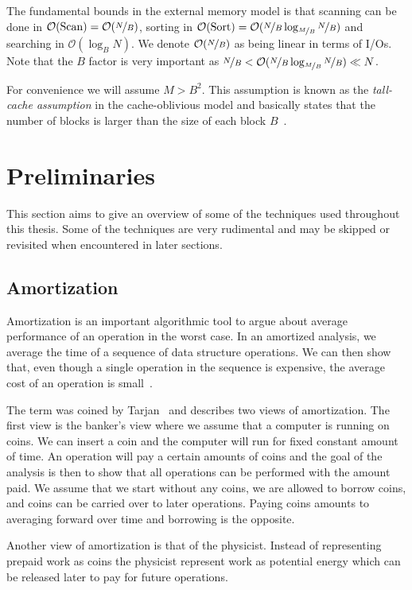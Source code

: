 \documentclass[twoside,11pt,openright]{report}
\begin{document}
The fundamental bounds in the external memory model is that scanning can be done in $\mathcal{O}(\text{Scan}) = \mathcal{O}(\nicefrac{N}{B})$, sorting in $\mathcal{O}(\text{Sort}) = \mathcal{O}(\nicefrac{N}{B} \log_{\nicefrac{M}{B}}\nicefrac{N}{B})$ and searching in $\mathcal{O}(\log_B N)$. We denote $\mathcal{O}(\nicefrac{N}{B})$ as being linear in terms of I/Os. Note that the $B$ factor is very important as $\nicefrac{N}{B} < \mathcal{O}(\nicefrac{N}{B} \log_{\nicefrac{M}{B}}\nicefrac{N}{B}) \ll N$.

For convenience we will assume $M > B^2$. This assumption is known as the \textit{tall-cache assumption} in the cache-oblivious model and basically states that the number of blocks  is larger than the size of each block $B$~\cite{Prokop99cache-obliviousalgorithms}.

\chapter{Preliminaries}
\label{chp:prelims}
This section aims to give an overview of some of the techniques used throughout this thesis. Some of the techniques are very rudimental and may be skipped or revisited when encountered in later sections.

\section{Amortization}
Amortization is an important algorithmic tool to argue about average performance of an operation in the worst case.
In an amortized analysis, we average the time of a sequence of data structure operations. We can then show that, even though a single operation in the sequence is expensive, the average cost of an operation is small~\cite[p.~451-452]{clrs}.

The term was coined by Tarjan~\cite{Tarjan85} and describes two views of amortization. The first view is the banker's view where we assume that a computer is running on coins. We can insert a coin and the computer will run for fixed constant amount of time. An operation will pay a certain amounts of coins and the goal of the analysis is then to show that all operations can be performed with the amount paid. We assume that we start without any coins, we are allowed to borrow coins, and coins can be carried over to later operations. Paying coins amounts to averaging forward over time and borrowing is the opposite.

Another view of amortization is that of the physicist. Instead of representing prepaid work as coins the physicist represent work as potential energy which can be released later to pay for future operations.
\end{document}
